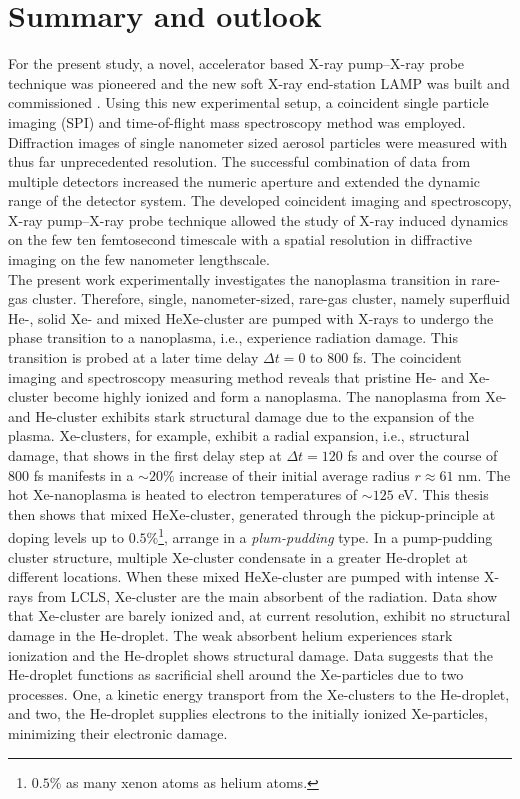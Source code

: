 \chapter{Summary and outlook}\label{ch:summary_outlook}
For the present study, a novel, accelerator based X-ray pump--X-ray probe technique was pioneered \citep{Lutman-2013-PRL} and the new soft X-ray end-station LAMP was built and commissioned \citep{Ferguson-2015-JSR}. Using this new experimental setup, a coincident single particle imaging (SPI) and time-of-flight mass spectroscopy method was employed. Diffraction images of single nanometer sized aerosol particles were measured with thus far unprecedented resolution. The successful combination of data from multiple detectors increased the numeric aperture and extended the dynamic range of the detector system. The developed coincident imaging and spectroscopy, X-ray pump--X-ray probe technique allowed the study of X-ray induced dynamics on the few ten femtosecond timescale with a spatial resolution in diffractive imaging on the few nanometer lengthscale.\\
%
The present work experimentally investigates the nanoplasma transition in rare-gas cluster. Therefore, single, nanometer-sized, rare-gas cluster, namely superfluid He-, solid Xe- and mixed HeXe-cluster are pumped with X-rays to undergo the phase transition to a nanoplasma, i.e., experience radiation damage. This transition is probed at a later time delay $\Delta t=0$ to $800$ fs. The coincident imaging and spectroscopy measuring method reveals that pristine He- and Xe-cluster become highly ionized and form a nanoplasma. The nanoplasma from Xe- and He-cluster exhibits stark structural damage due to the expansion of the plasma. Xe-clusters, for example, exhibit a radial expansion, i.e., structural damage, that shows in the first delay step at $\Delta t = 120$ fs and over the course of 800 fs manifests in a $\sim 20 \%$ increase of their initial average radius $r\approx 61$ nm. The hot Xe-nanoplasma is heated to electron temperatures of $\sim 125$ eV. This thesis then shows that mixed HeXe-cluster, generated through the pickup-principle at doping levels up to $0.5\%$\footnote{$0.5\%$ as many xenon atoms as helium atoms.}, arrange in a \textit{plum-pudding} type. In a pump-pudding cluster structure, multiple Xe-cluster condensate in a greater He-droplet at different locations. When these mixed HeXe-cluster are pumped with intense X-rays from LCLS, Xe-cluster are the main absorbent of the radiation. Data show that Xe-cluster are barely ionized and, at current resolution, exhibit no structural damage in the He-droplet. The weak absorbent helium experiences stark ionization and the He-droplet shows structural damage. Data suggests that the He-droplet functions as sacrificial shell around the Xe-particles due to two processes. One, a kinetic energy transport from the Xe-clusters to the He-droplet, and two, the He-droplet supplies electrons to the initially ionized Xe-particles, minimizing their electronic damage.\\
